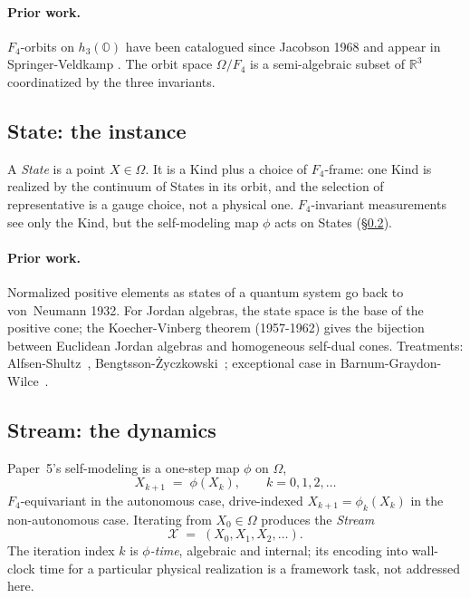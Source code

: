 \documentclass[12pt]{article}
\theoremstyle{remark}
\newcommand{\hthree}{h_3(\mathbb{O})}
\newcommand{\Ffour}{F_4}
\newcommand{\Stream}{\mathcal{X}}
\begin{document}
\paragraph{Prior work.} $\Ffour$-orbits on $\hthree$ have been
catalogued since Jacobson 1968 and appear in Springer-Veldkamp
\cite{springer-veldkamp2000}. The orbit space $\Omega / \Ffour$ is a
semi-algebraic subset of $\mathbb{R}^3$ coordinatized by the three
invariants.

\subsection{State: the instance}
\label{sec:state}

A \emph{State} is a point $X \in \Omega$. It is a Kind plus a choice of
$\Ffour$-frame: one Kind is realized by the continuum of States in its
orbit, and the selection of representative is a gauge choice, not a
physical one. $\Ffour$-invariant measurements see only the Kind, but the
self-modeling map $\phi$ acts on States
(\S\ref{sec:stream}).

\paragraph{Prior work.} Normalized positive elements as states of a
quantum system go back to von~Neumann 1932. For Jordan algebras, the
state space is the base of the positive cone; the Koecher-Vinberg
theorem (1957-1962) gives the bijection between Euclidean Jordan
algebras and homogeneous self-dual cones. Treatments:
Alfsen-Shultz~\cite{alfsen-shultz2001},
Bengtsson-\.Zyczkowski~\cite{bengtsson-zyczkowski2006}; exceptional
case in Barnum-Graydon-Wilce~\cite{barnum-graydon-wilce2015}.

\subsection{Stream: the dynamics}
\label{sec:stream}

Paper~5's self-modeling is a one-step map $\phi$ on $\Omega$,
\begin{equation}\label{eq:phi-iteration}
  X_{k+1} \;=\; \phi(X_k), \qquad k = 0, 1, 2, \ldots
\end{equation}
$\Ffour$-equivariant in the autonomous case, drive-indexed
$X_{k+1} = \phi_k(X_k)$ in the non-autonomous case. Iterating from
$X_0 \in \Omega$ produces the \emph{Stream}
\begin{equation}\label{eq:stream}
  \Stream \;=\; (X_0, X_1, X_2, \ldots).
\end{equation}
The iteration index $k$ is \emph{$\phi$-time}, algebraic and internal;
its encoding into wall-clock time for a particular physical
realization is a framework task, not addressed here.
\end{document}
